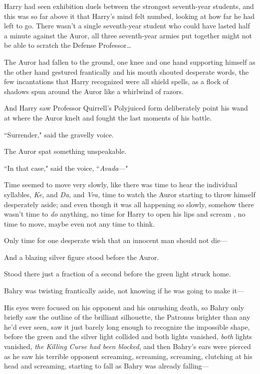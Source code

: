 Harry had seen exhibition duels between the strongest seventh-year students, and this was so far above it that Harry's mind felt numbed, looking at how far he had left to go. There wasn't a single seventh-year student who could have lasted half a minute against the Auror, all three seventh-year armies put together might not be able to scratch the Defense Professor{\ldots}

The Auror had fallen to the ground, one knee and one hand supporting himself as the other hand gestured frantically and his mouth shouted desperate words, the few incantations that Harry recognized were all shield spells, as a flock of shadows spun around the Auror like a whirlwind of razors.

And Harry saw Professor Quirrell's Polyjuiced form deliberately point his wand at where the Auror knelt and fought the last moments of his battle.

``Surrender," said the gravelly voice.

The Auror spat something unspeakable.

``In that case," said the voice, ``\emph{Avada}---"

Time seemed to move very slowly, like there was time to hear the individual syllables, \emph{Ke,} and \emph{Da,} and \emph{Vra,} time to watch the Auror starting to throw himself desperately aside; and even though it was all happening so slowly, somehow there wasn't time to \emph{do} anything, no time for Harry to open his lips and scream , no time to move, maybe even not any time to think.

Only time for one desperate wish that an innocent man should not die---

And a blazing silver figure stood before the Auror.

Stood there just a fraction of a second before the green light struck home.

\later

Bahry was twisting frantically aside, not knowing if he was going to make it---

His eyes were focused on his opponent and his onrushing death, so Bahry only briefly saw the outline of the brilliant silhouette, the Patronus brighter than any he'd ever seen, saw it just barely long enough to recognize the impossible shape, before the green and the silver light collided and both lights vanished, \emph{both} lights vanished, \emph{the Killing Curse had been blocked}, and then Bahry's ears were pierced as he saw his terrible opponent screaming, screaming, screaming, clutching at his head and screaming, starting to fall as Bahry was already falling---

